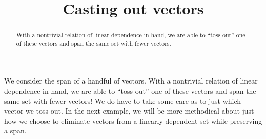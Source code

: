 \documentclass{ximera}
\title{Casting out vectors}
\begin{document}
\begin{abstract}
  With a nontrivial relation of linear dependence in hand, we are able
  to ``toss out'' one of these vectors and span the same set with
  fewer vectors.
\end{abstract}
\maketitle

We consider the span of a handful of vectors.  With a nontrivial
relation of linear dependence in hand, we are able to ``toss out'' one
of these vectors and span the same set with fewer vectors!  We do have
to take some care as to just which vector we toss out.  In the next
example, we will be more methodical about just how we choose to
eliminate vectors from a linearly dependent set while preserving a
span.
\end{document}
